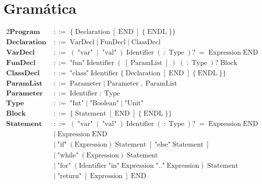 \documentclass[a4paper,11pt]{article}
\begin{document}
\section*{Gramática}

\begin{alignat*}{2}
\textbf{Program}
  \;&::=\; \{\;\text{Declaration}\;[\;\text{END}\;]\;\{\;\text{ENDL}\;\}\} \\[4pt]
\textbf{Declaration}
  \;&::=\; \text{VarDecl}
   \;|\;\text{FunDecl}
   \;|\;\text{ClassDecl} \\[4pt]
\textbf{VarDecl}
  \;&::=\; (\;\text{"var"}\;\mid\;\text{"val"}\;)\;\text{Identifier}
     \;(\;:\;\text{Type}\;)?
     \;=\;\text{Expression}\;\text{END} \\[4pt]
\textbf{FunDecl}
  \;&::=\; \text{"fun"}\;\text{Identifier}
     \;(\;[\;\text{ParamList}\;]\;)
     \;(\;:\;\text{Type}\;)?
     \;\text{Block} \\[4pt]
\textbf{ClassDecl}
  \;&::=\; \text{"class"}\;\text{Identifier}
     \;\{\;\text{Declaration}\;[\;\text{END}\;]\;\{\;\text{ENDL}\;\}\} \\[4pt]
\textbf{ParamList}
  \;&::=\; \text{Parameter}
   \;|\;\text{Parameter}\;,\;\text{ParamList} \\[4pt]
\textbf{Parameter}
  \;&::=\; \text{Identifier}\;:\;\text{Type} \\[4pt]
\textbf{Type}
  \;&::=\; \text{"Int"}
   \;|\;\text{"Boolean"}
   \;|\;\text{"Unit"} \\[4pt]
\textbf{Block}
  \;&::=\; \{\;\text{Statement}\;[\;\text{END}\;]\;\{\;\text{ENDL}\;\}\} \\[4pt]
\textbf{Statement}
  \;&::=\; (\;\text{"var"}\;\mid\;\text{"val"}\;)\;\text{Identifier}
     \;(\;:\;\text{Type}\;)?
     \;=\;\text{Expression}\;\text{END} \\
  \;&\mid\; \text{Expression}\;\text{END} \\
  \;&\mid\; \text{"if"}\;( \text{Expression} )\;\text{Statement}
     \;[\;\text{"else"}\;\text{Statement}\;] \\[4pt]
  \;&\mid\; \text{"while"}\;( \text{Expression} )\;\text{Statement} \\[4pt]
  \;&\mid\; \text{"for"}\;( \text{Identifier}\;\text{"in"}\;\text{Expression}
     \;\text{".."}\;\text{Expression} )\;\text{Statement} \\[4pt]
  \;&\mid\; \text{"return"}\;[\;\text{Expression}\;]\;\text{END} \\[4pt]

\end{alignat*}
\end{document}
